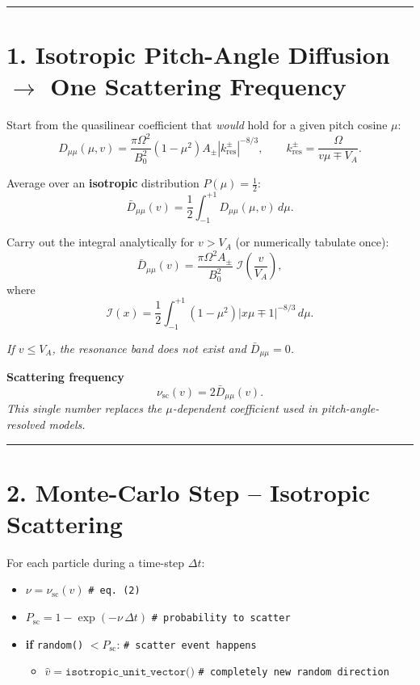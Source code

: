 \bigskip
\hrule
\bigskip

\section*{1. Isotropic Pitch-Angle Diffusion \(\rightarrow\) One \textbf{Scattering Frequency}}

Start from the quasilinear coefficient that \emph{would} hold for a given pitch cosine \( \mu \):
\[
D_{\mu\mu}(\mu, v) = \frac{\pi \Omega^2}{B_0^2} (1 - \mu^2) A_\pm \left| k_{\text{res}}^\pm \right|^{-8/3}, \qquad
k_{\text{res}}^\pm = \frac{\Omega}{v\mu \mp V_A}.
\]

Average over an \textbf{isotropic} distribution \( P(\mu) = \frac{1}{2} \):
\[
\boxed{ \bar{D}_{\mu\mu}(v) = \frac{1}{2} \int_{-1}^{+1} D_{\mu\mu}(\mu, v) \, d\mu. }
\tag{1}
\]

Carry out the integral analytically for \( v > V_A \) (or numerically tabulate once):
\[
\bar{D}_{\mu\mu}(v) = \frac{\pi \Omega^2 A_\pm}{B_0^2} \; \mathcal{I}\left( \frac{v}{V_A} \right),
\]
where
\[
\mathcal{I}(x) = \frac{1}{2} \int_{-1}^{+1} (1 - \mu^2) \left| x\mu \mp 1 \right|^{-8/3} \, d\mu.
\]

\emph{If \( v \leq V_A \), the resonance band does not exist and \( \bar{D}_{\mu\mu} = 0 \).}

\bigskip

\textbf{Scattering frequency}
\[
\boxed{ \nu_{\text{sc}}(v) = 2 \bar{D}_{\mu\mu}(v). }
\tag{2}
\]
\emph{This single number replaces the \( \mu \)-dependent coefficient used in pitch-angle-resolved models.}

\bigskip
\hrule
\bigskip

\section*{2. Monte-Carlo Step – Isotropic Scattering}

For each particle during a time-step \( \Delta t \):
\begin{tcolorbox}[colframe=black, colback=white, title=Isotropic Scattering Step]
\begin{itemize}
    \item \( \nu = \nu_{\text{sc}}(v) \) \hfill \texttt{\# eq.~(2)}
    \item \( P_{\text{sc}} = 1 - \exp(-\nu \, \Delta t) \) \hfill \texttt{\# probability to scatter}
    \item \textbf{if} \texttt{random()} \( < P_{\text{sc}} \): \hfill \texttt{\# scatter event happens}
    \begin{itemize}
        \item \( \hat{v} = \texttt{isotropic\_unit\_vector()} \) \hfill \texttt{\# completely new random direction}
    \end{itemize}
\end{itemize}
\end{tcolorbox}

